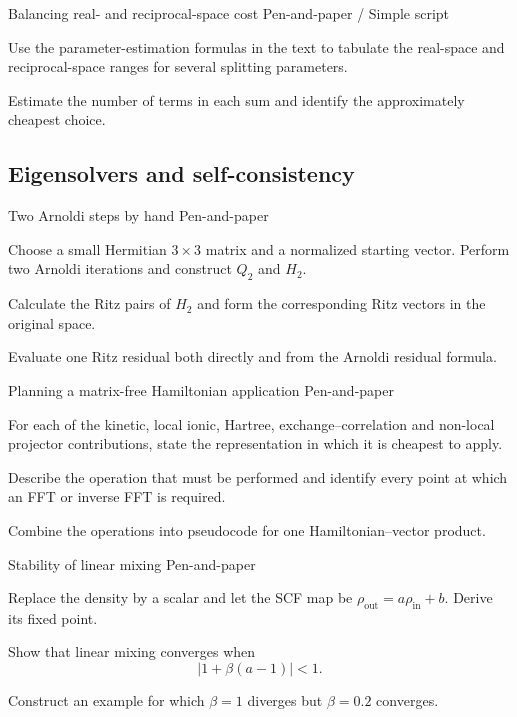\begin{exci}{Balancing real- and reciprocal-space cost \hfill\textnormal{\small Pen-and-paper / Simple script}}
    \item Use the parameter-estimation formulas in the text to tabulate the
    real-space and reciprocal-space ranges for several splitting parameters.
    \item Estimate the number of terms in each sum and identify the
    approximately cheapest choice.
\end{exci}

%
%
%
\subsection{Eigensolvers and self-consistency}

\begin{exci}{Two Arnoldi steps by hand \hfill\textnormal{\small Pen-and-paper}}
    \item Choose a small Hermitian $3\times3$ matrix and a normalized starting
    vector. Perform two Arnoldi iterations and construct $Q_2$ and $H_2$.
    \item Calculate the Ritz pairs of $H_2$ and form the corresponding Ritz
    vectors in the original space.
    \item Evaluate one Ritz residual both directly and from the Arnoldi
    residual formula.
\end{exci}

\begin{exci}{Planning a matrix-free Hamiltonian application \hfill\textnormal{\small Pen-and-paper}}
    \item For each of the kinetic, local ionic, Hartree,
    exchange--correlation and non-local projector contributions, state the
    representation in which it is cheapest to apply.
    \item Describe the operation that must be performed and identify every
    point at which an FFT or inverse FFT is required.
    \item Combine the operations into pseudocode for one Hamiltonian--vector
    product.
\end{exci}

\begin{exci}{Stability of linear mixing \hfill\textnormal{\small Pen-and-paper}}
    \item Replace the density by a scalar and let the SCF map be
    $\rho_{\textrm{out}}=a\rho_{\textrm{in}}+b$. Derive its fixed point.
    \item Show that linear mixing converges when
    \begin{equation*}
        \left|1+\beta(a-1)\right|<1.
    \end{equation*}
    \item Construct an example for which $\beta=1$ diverges but $\beta=0.2$
    converges.
\end{exci}

